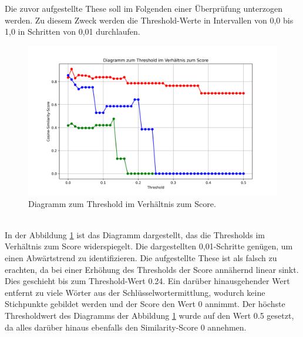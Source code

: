 Die zuvor aufgestellte These soll im Folgenden einer Überprüfung unterzogen werden. Zu diesem Zweck werden die Threshold-Werte in Intervallen von 0,0 bis 1,0 in Schritten von 0,01 durchlaufen.
\begin{figure}[H]
	\centering  
	\includegraphics[width=\linewidth]{plot/e2-threshold-score.png}
	\caption{Diagramm zum Threshold im Verhältnis zum Score.}
	\label{fig:thresholdvsscore}
\end{figure}\mbox{} \\
In der Abbildung \ref{fig:thresholdvsscore} ist das Diagramm dargestellt, das die Thresholds im Verhältnis zum Score widerspiegelt. Die dargestellten 0,01-Schritte genügen, um einen Abwärtstrend zu identifizieren. Die aufgestellte These ist als falsch zu erachten, da bei einer Erhöhung des Thresholds der Score annähernd linear sinkt. Dies geschieht bis zum Threshold-Wert 0.24. Ein darüber hinausgehender Wert entfernt zu viele Wörter aus der Schlüsselwortermittlung, wodurch keine Stichpunkte gebildet werden und der Score den Wert 0 annimmt. Der höchste Thresholdwert des Diagramms der Abbildung \ref{fig:thresholdvsscore} wurde auf den Wert 0.5 gesetzt, da alles darüber hinaus ebenfalls den Similarity-Score 0 annehmen.
